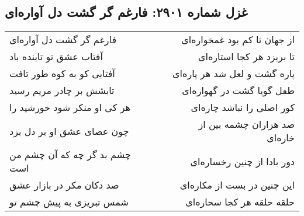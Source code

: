 \begin{center}
\section*{غزل شماره ۲۹۰۱: فارغم گر گشت دل آواره‌ای}
\label{sec:2901}
\begin{longtable}{l p{0.5cm} r}
فارغم گر گشت دل آواره‌ای
&&
از جهان تا کم بود غمخواره‌ای
\\
آفتاب عشق تو تابنده باد
&&
تا بریزد هر کجا استاره‌ای
\\
آفتابی کو به کوه طور تافت
&&
پاره گشت و لعل شد هر پاره‌ای
\\
تابشش بر چادر مریم رسید
&&
طفل گویا گشت در گهواره‌ای
\\
هر کی او منکر شود خورشید را
&&
کور اصلی را نباشد چاره‌ای
\\
چون عصای عشق او بر دل بزد
&&
صد هزاران چشمه بین از خاره‌ای
\\
چشم بد گر چه که آن چشم من است
&&
دور بادا از چنین رخساره‌ای
\\
صد دکان مکر در بازار عشق
&&
این چنین در بست از مکاره‌ای
\\
شمس تبریزی به پیش چشم تو
&&
حلقه حلقه هر کجا سحاره‌ای
\\
\end{longtable}
\end{center}
